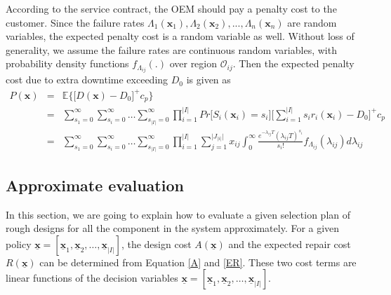 \documentclass[preprint,12pt]{elsarticle}
\begin{document}
According to the service contract, the OEM should pay a penalty cost to the customer. Since the failure rates $\Lambda_{1}(\boldsymbol{x}_{1}),\Lambda_{2}(\boldsymbol{x}_{2}),...,\Lambda_{n}(\boldsymbol{x}_{n})$ are random variables, the expected penalty cost is a random variable as well. Without loss of generality, we assume the failure rates are continuous random variables, with probability density functions $f_{\Lambda_{ij}}(.)$ over region $\mathcal{O}_{ij}$. Then the expected penalty cost due to extra downtime exceeding $D_{0}$ is given as
\small
\begin{eqnarray}
P(\boldsymbol{x})& = & \mathbb{E}\bigg\{\bigg[D(\boldsymbol{x})-D_{0}\bigg]^{+} c_{p} \bigg\} \nonumber\\
&=&\sum_{s_{1}=0}^{\infty}\sum_{s_{i}=0}^{\infty}\dots\sum_{s_{\rvert I \lvert}=0}^{\infty}{\prod_{i=1}^{\rvert I \lvert} {Pr\bigg[S_{i}(\boldsymbol{x}_{i})=s_{i}\bigg]}} \bigg[\sum_{i=1}^{\rvert I \lvert}{s_{i}r_{i}(\boldsymbol{x}_{i})}-D_{0}\bigg]^{+}c_{p} \nonumber\\
&=& \sum_{s_{1}=0}^{\infty}\sum_{s_{i}=0}^{\infty}\dots\sum_{s_{\rvert I \lvert}=0}^{\infty}{\prod_{i=1}^{\rvert I \lvert}{\sum_{j=1}^{\rvert J_{\rvert i \lvert} \lvert}{x_{ij}\int_{0}^{\infty}{\frac{e^{-\lambda_{ij}T}(\lambda_{ij}T)^{s_{i}}}{s_{i}!}
f_{\Lambda_{ij}}(\lambda_{ij})d\lambda_{ij}}}}}
\label{penaltycost}
\end{eqnarray}

\normalsize
\subsection{Approximate evaluation}
In this section, we are going to explain how to evaluate a given selection plan of rough designs for all the component in the system approximately. For a given policy $\boldsymbol{\underline{x}}=[\boldsymbol{\underline{x}}_{1},\boldsymbol{\underline{x}}_{2},\dots,\boldsymbol{\underline{x}}_{\lvert I \rvert}]$, the design cost $A(\boldsymbol{\underline{x}})$ and the expected repair cost $R(\boldsymbol{\underline{x}})$ can be determined from Equation \eqref{A} and \eqref{ER}. These two cost terms are linear functions of the decision variables $\underline{\boldsymbol{x}}=[\boldsymbol{\underline{x}}_{1},\boldsymbol{\underline{x}}_{2},\dots,\boldsymbol{\underline{x}}_{\lvert I \rvert}]$.
\end{document}
